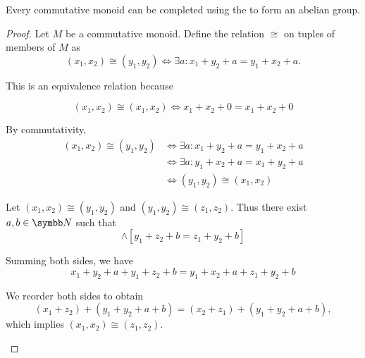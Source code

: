 \begin{proposition}\label{thm:monoid_completion_to_abelian_group}\cite{nLab:grothendieck_group_of_a_commutative_monoid}
  Every commutative monoid can be completed using the  to form an abelian group.
\end{proposition}
\begin{proof}
  Let \( M \) be a commutative monoid. Define the relation \( \cong \) on tuples of members of \( M \) as
  \begin{equation*}
    (x_1, x_2) \cong (y_1, y_2) \iff \exists a: x_1 + y_2 + a = y_1 + x_2 + a.
  \end{equation*}

  This is an equivalence relation because
  \begin{description}
    \begin{equation*}
      (x_1, x_2) \cong (x_1, x_2) \iff x_1 + x_2 + 0 = x_1 + x_2 + 0
    \end{equation*}

     By commutativity,
    \begin{align*}
      (x_1, x_2) \cong (y_1, y_2)
      &\iff 
      \exists a: x_1 + y_2 + a = y_1 + x_2 + a
      \\ &\iff
      \exists a: y_1 + x_2 + a = x_1 + y_2 + a
      \\ &\iff
      (y_1, y_2) \cong (x_1, x_2)
    \end{align*}

     Let \( (x_1, x_2) \cong (y_1, y_2) \) and \( (y_1, y_2) \cong (z_1, z_2) \). Thus there exist \( a, b \in \N \) such that
    \begin{equation*}
      [x_1 + y_2 + a = y_1 + x_2 + a] \land [y_1 + z_2 + b = z_1 + y_2 + b]
    \end{equation*}

    Summing both sides, we have
    \begin{equation*}
      x_1 + y_2 + a + y_1 + z_2 + b = y_1 + x_2 + a + z_1 + y_2 + b
    \end{equation*}

    We reorder both sides to obtain
    \begin{equation*}
      (x_1 + z_2) + (y_1 + y_2 + a + b) = (x_2 + z_1) + (y_1 + y_2 + a + b),
    \end{equation*}
    which implies \( (x_1, x_2) \cong (z_1, z_2) \).
  \end{description}


\end{proof}
